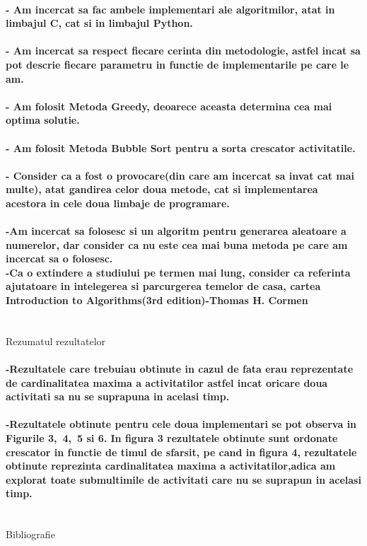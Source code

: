 \documentclass[12pt, a4paper,oneside]{article}
\begin{document}
\paragraph{
- Am incercat sa fac ambele implementari ale algoritmilor, atat in limbajul C, cat si in limbajul Python.\\\\
- Am incercat sa respect fiecare cerinta din metodologie, astfel incat sa pot descrie fiecare parametru in functie de implementarile pe care le am.\\\\
- Am folosit Metoda Greedy, deoarece aceasta determina cea mai optima solutie.\\\\
- Am folosit Metoda Bubble Sort pentru a sorta crescator activitatile.\\\\
- Consider ca a fost o provocare(din care am incercat sa invat cat mai multe), atat gandirea celor doua metode, cat si implementarea acestora in cele doua limbaje de programare.\\\\
-Am incercat sa folosesc si un algoritm pentru generarea aleatoare a numerelor, dar consider ca nu este cea mai buna metoda pe care am incercat sa o folosesc.\\
-Ca o extindere a studiului pe termen mai lung, consider ca referinta ajutatoare in intelegerea si parcurgerea temelor de casa, cartea Introduction to Algorithms(3rd edition)-Thomas H. Cormen\\\\}
\newpage
\begin{center}
\Huge
{Rezumatul rezultatelor}
\vspace{2em}
\end{center}
\large
\paragraph{
-Rezultatele care trebuiau obtinute in cazul de fata erau reprezentate de cardinalitatea maxima a activitatilor astfel incat oricare doua activitati sa nu se suprapuna in acelasi timp.\\\\
-Rezultatele obtinute pentru cele doua implementari se pot observa in Figurile 3,\ 4,\ 5 si 6. In figura 3  rezultatele obtinute sunt ordonate crescator in functie de timul de sfarsit, pe cand in figura 4, rezultatele obtinute reprezinta cardinalitatea maxima a activitatilor,adica am explorat toate submultimile de activitati care nu se suprapun in acelasi timp.\\\\
}
\begin{center}
\Huge
{Bibliografie}
\vspace{1em}
\end{center}
\end{document}
